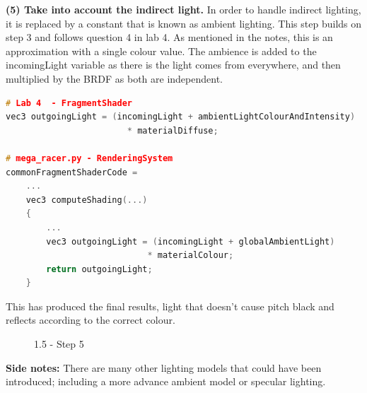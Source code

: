 \documentclass[a4 paper, 12pt]{article}
\begin{document}
\textbf{(5) Take into account the indirect light.}
In order to handle indirect lighting, it is replaced by a constant that is known as ambient lighting. This step builds on step 3 and follows question 4 in lab 4. As mentioned in the notes, this is an approximation with a single colour value. The ambience is added to the incomingLight variable as there is the light comes from everywhere, and then multiplied by the BRDF as both are independent.
    \begin{lstlisting}[language=c++] 
# Lab 4  - FragmentShader
vec3 outgoingLight = (incomingLight + ambientLightColourAndIntensity) 
                        * materialDiffuse;

# mega_racer.py - RenderingSystem
commonFragmentShaderCode =
    ...
    vec3 computeShading(...)
    {
        ...
        vec3 outgoingLight = (incomingLight + globalAmbientLight) 
                            * materialColour;
        return outgoingLight;
    }       
    \end{lstlisting}

This has produced the final results, light that doesn't cause pitch black and reflects according to the correct colour.
    \begin{figure} [H]
        
        \caption{1.5 - Step 5}   
    \end{figure}

\textbf{Side notes:} There are many other lighting models that could have been introduced; including a more advance ambient model or specular lighting. 
\end{document}
